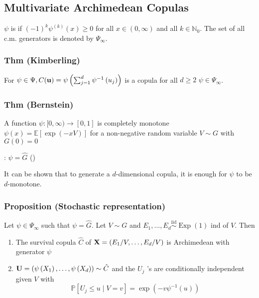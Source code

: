 \subsection*{Multivariate Archimedean Copulas}
$\psi$ is  if $(-1)^{k} \psi^{(k)}(x) \geq 0$ for all $x \in(0, \infty)$ and all $k \in \mathbb{N}_{0}$. The set of all c.m. generators is denoted by $\Psi_{\infty}$.

\subsubsection*{Thm (Kimberling)}
For $\psi \in \Psi, C(\operatorname{\boldsymbol{\mathbf{u}}})=\psi\left(\sum_{j=1}^{d} \psi^{-1}\left(u_{j}\right)\right)$ is a copula for all $d \geq 2$  $\psi \in \Psi_{\infty}$.

\subsubsection*{Thm (Bernstein)}
A function $\psi:[0, \infty) \rightarrow[0,1]$ is completely monotone 
$\psi(x)=\mathbb{E}[\exp (-x V)]$ for a non-negative random variable $V \sim G$ with $G(0)=0$

: $\psi=\hat{G}$ ()

It can be shown that to generate a $d$-dimensional copula, it is enough for $\psi$ to be $d$-monotone.





\subsubsection*{Proposition (Stochastic representation)}
Let $\psi \in \Psi_{\infty}$ such that $\psi=\hat{G}$. Let $V \sim G$ and $E_{1}, \ldots, E_{d} \stackrel{\mathrm{iid}}{\sim} \operatorname{Exp}(1)$ ind of $V$. Then
\begin{enumerate}[label = (\arabic*), leftmargin=*]
    \item The survival copula $\hat{C}$ of $\operatorname{\boldsymbol{\mathbf{X}}}=\left(E_{1} / V, \ldots, E_{d} / V\right)$ is Archimedean with generator $\psi$
    \item $\operatorname{\boldsymbol{\mathbf{U}}}=\left(\psi\left(X_{1}\right), \ldots, \psi\left(X_{d}\right)\right) \sim \hat{C}$ and the $U_{j}$ 's are conditionally independent given $V$ with
$$
\mathbb{P}\left[U_{j} \leq u \mid V=v\right]=\exp \left(-v \psi^{-1}(u)\right)
$$
\end{enumerate}


